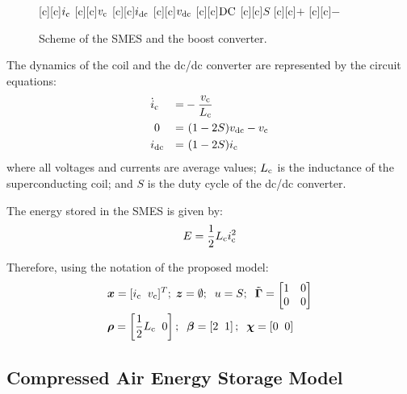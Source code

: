\documentclass[journal, a4paper]{IEEEtran}
\begin{document}
\begin{figure}[htb]
  \begin{center}
   [c][c]{\Huge $i_{\rm c}$}
    [c][c]{\Huge $v_{\rm c}$}
    [c][c]{\Huge $i_{\rm dc}$}
    [c][c]{\Huge $v_{\rm dc}$}
    [c][c]{\Huge $\rm DC$}
    [c][c]{\Huge $S$}
    \psfrag{+}[c][c]{\LARGE $+$}
    \psfrag{-}[c][c]{\LARGE $-$}
\caption{Scheme of the SMES and the boost converter.}
    \label{fig:SMES}
  \end{center}
\vspace{-0.4cm}
\end{figure}

The dynamics of the coil and the dc/dc converter are represented by
the circuit equations:
\begin{alignat}{3}
  \nonumber & \dot{i}_{\rm c} &=& -\frac{v_{\rm c}}{L_{\rm c}} \\
  \label{smesmodel}
  &\ 0 &=& \ (1 - 2 S) v_{\rm dc} - v_{\rm c}\\
  \nonumber & i_{\rm dc} &=& \ (1 - 2 S) i_{\rm c}  
\end{alignat}
where all voltages and currents are average values; $L_{\rm c}$ is the
inductance of the superconducting coil; and $S$ is the duty cycle of
the dc/dc converter.

The energy stored in the SMES is given by:
\begin{equation}
  E = \frac{1}{2} L_{\rm c} i_{\rm c}^2
\end{equation}

Therefore, using the notation of the proposed model:
\begin{alignat}{3}
  \nonumber & \boldsymbol{x} = [i_{\rm c} \; \; v_{\rm c}]^T; \;
  \boldsymbol{z} = \emptyset; \; \; u = S; \; \;
  \tilde{\mathbf{\Gamma}} = {\scriptscriptstyle{\begin{bmatrix} 1 & 0
        \\ 0 & 0 \end{bmatrix}}} \\ & \boldsymbol{\rho} =
  \left[\frac{1}{2} L_{\rm c} \; \; 0 \right] ; \; \;
  \boldsymbol{\beta} = \left[ 2 \; \; 1 \right]; \; \;
  \boldsymbol{\chi} = \left[0 \; \; 0 \right]
\end{alignat}


\vspace{-5mm}

\subsection{Compressed Air Energy Storage Model}
\label{subsec:caes}
\end{document}
